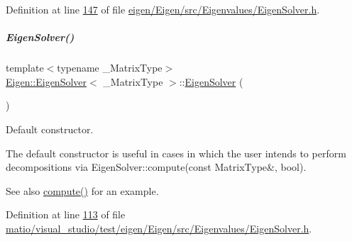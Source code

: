 Definition at line \hyperlink{eigen_2_eigen_2src_2_eigenvalues_2_eigen_solver_8h_source_l00147}{147} of file \hyperlink{eigen_2_eigen_2src_2_eigenvalues_2_eigen_solver_8h_source}{eigen/\+Eigen/src/\+Eigenvalues/\+Eigen\+Solver.\+h}.

\mbox{\label{group___eigenvalues___module_a3af22d721a6401365881b2ef252d26aa}} 
\subparagraph{\texorpdfstring{Eigen\+Solver()}{EigenSolver()}\hspace{0.1cm}{\footnotesize\ttfamily [4/6]}}
{\footnotesize\ttfamily template$<$typename \+\_\+\+Matrix\+Type$>$ \\
\hyperlink{group___eigenvalues___module_class_eigen_1_1_eigen_solver}{Eigen\+::\+Eigen\+Solver}$<$ \+\_\+\+Matrix\+Type $>$\+::\hyperlink{group___eigenvalues___module_class_eigen_1_1_eigen_solver}{Eigen\+Solver} (\begin{DoxyParamCaption}{ }\end{DoxyParamCaption})\hspace{0.3cm}{\ttfamily [inline]}}



Default constructor. 

The default constructor is useful in cases in which the user intends to perform decompositions via Eigen\+Solver\+::compute(const Matrix\+Type\&, bool).

\begin{DoxySeeAlso}{See also}
\hyperlink{group___eigenvalues___module_a38d032b75b3e75640e3db42e7ab20c24}{compute()} for an example. 
\end{DoxySeeAlso}


Definition at line \hyperlink{matio_2visual__studio_2test_2eigen_2_eigen_2src_2_eigenvalues_2_eigen_solver_8h_source_l00113}{113} of file \hyperlink{matio_2visual__studio_2test_2eigen_2_eigen_2src_2_eigenvalues_2_eigen_solver_8h_source}{matio/visual\+\_\+studio/test/eigen/\+Eigen/src/\+Eigenvalues/\+Eigen\+Solver.\+h}.

